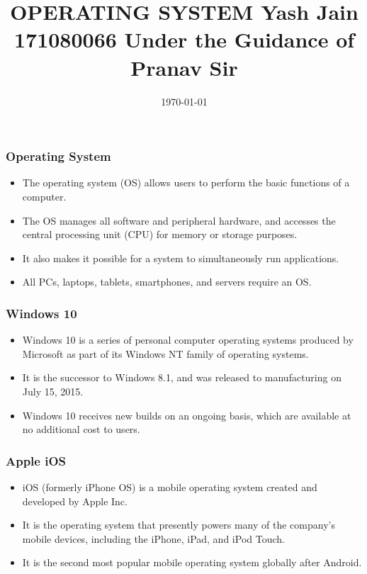 \documentclass[10pt,    %
    english,            %
    xcolor=table,       %
    envcountsect        %
]{beamer}
\title[Short Title] %
    {OPERATING SYSTEM  \newline Yash Jain 171080066 \newline \newline Under the Guidance of Pranav Sir }
\date[Short date] %
    {\today}
\begin{document}
\begin{frame}
  \titlepage
\end{frame}

\begin{frame}
    \label{frm:first}
    \frametitle{Operating System} 
    
    \begin{itemize}
        \item The operating system (OS) allows users to perform the basic functions of a computer.
        \item The OS manages all software and peripheral hardware, and accesses the central processing unit (CPU) for memory or storage purposes.
        \item It also makes it possible for a system to simultaneously run applications.
        \item All PCs, laptops, tablets, smartphones, and servers require an OS.
    \end{itemize}
\end{frame}


\begin{frame}
    \label{frm:second}
    \frametitle{Windows 10} 
    
    \begin{itemize}
        \item Windows 10 is a series of personal computer operating systems produced by Microsoft as part of its Windows NT family of operating systems.
        \item It is the successor to Windows 8.1, and was released to manufacturing on July 15, 2015.
        \item Windows 10 receives new builds on an ongoing basis, which are available at no additional cost to users.
    \end{itemize}
    
\end{frame}


\begin{frame}
    \label{frm:second}
    \frametitle{Apple iOS} 
    
    \begin{itemize}
        \item iOS (formerly iPhone OS) is a mobile operating system created and developed by Apple Inc.
        \item It is the operating system that presently powers many of the company's mobile devices, including the iPhone, iPad, and iPod Touch.
        \item It is the second most popular mobile operating system globally after Android.
    \end{itemize}
\end{frame}
\end{document}
